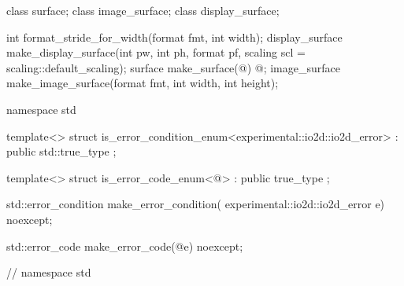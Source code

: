 \begin{codeblock}
{{{{  class surface;
  class image_surface;
  class display_surface;
  
  int format_stride_for_width(format fmt, int width);
  display_surface make_display_surface(int pw, int ph, format pf,
    scaling scl = scaling::default_scaling);
  surface make_surface(@\impdef@) @\impdef@;
  image_surface make_image_surface(format fmt, int width, int height);
} } } }

namespace std {
	template<>
	struct is_error_condition_enum<experimental::io2d::io2d_error>
		: public std::true_type{ };

	template<>
	struct is_error_code_enum<@\impdef@>
		: public true_type{ };

	std::error_condition make_error_condition(
	  experimental::io2d::io2d_error e) noexcept;

	std::error_code make_error_code(@\impdef@ e) noexcept;
} // namespace std

\end{codeblock}
%
